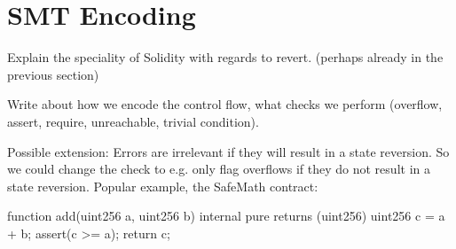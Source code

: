 \section{SMT Encoding}

Explain the speciality of Solidity with regards to revert. (perhaps already in the previous section)

Write about how we encode the control flow, what checks we perform (overflow, assert, require, unreachable, trivial condition).

Possible extension: Errors are irrelevant if they will result in a state reversion. So we could change the check to e.g. only flag overflows if they do not result in a state reversion. Popular example, the SafeMath contract:

\begin{verb}
  function add(uint256 a, uint256 b) internal pure returns (uint256) {
    uint256 c = a + b;
    assert(c >= a);
    return c;
  }
\end{verb}
